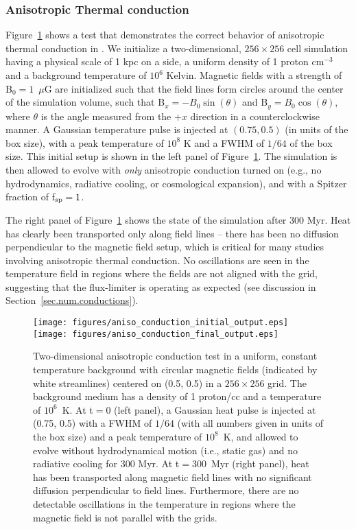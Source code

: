 \subsubsection{Anisotropic Thermal conduction}
\label{sec.tests.conduct}

Figure~\ref{fig.conduct} shows a test that demonstrates the correct
behavior of anisotropic thermal conduction in \enzo. We initialize a
two-dimensional, $256 \times 256$ cell simulation having a physical
scale of 1 kpc on a side, a uniform density of 1 proton cm$^{-3}$ and
a background temperature of $10^6$ Kelvin.  Magnetic fields with a
strength of B$_0 = 1$~$\mu$G are initialized such that the field lines
form circles around the center of the simulation volume, such that
B$_x = -B_0\sin(\theta)$ and B$_y = B_0\cos(\theta)$, where $\theta$
is the angle measured from the $+x$ direction in a counterclockwise
manner.  A Gaussian temperature pulse is injected at $(0.75, 0.5)$ (in
units of the box size), with a peak temperature of $10^8$ K and a FWHM
of $1/64$ of the box size.  This initial setup is shown in the left
panel of Figure~\ref{fig.conduct}.  The simulation is then allowed to
evolve with \textit{only} anisotropic conduction turned on (e.g., no
hydrodynamics, radiative cooling, or cosmological expansion), and with
a Spitzer fraction of f$_{\rm sp} = 1$.

The right panel of Figure~\ref{fig.conduct} shows the state of the
simulation after 300 Myr.  Heat has clearly been transported only
along field lines -- there has been no diffusion perpendicular to the
magnetic field setup, which is critical for many studies involving
anisotropic thermal conduction.  No oscillations are seen in the
temperature field in regions where the fields are not aligned with the
grid, suggesting that the flux-limiter is operating as expected (see
discussion in Section~\ref{sec.num.conductions}).

\begin{figure}
\begin{center}
\texttt{[image: figures/aniso\_conduction\_initial\_output.eps]}
\texttt{[image: figures/aniso\_conduction\_final\_output.eps]}
\caption{Two-dimensional anisotropic conduction test in a uniform, constant
temperature background with circular magnetic fields (indicated by white
streamlines) centered on (0.5, 0.5) in a $256 \times 256$ grid. The background
medium has a density of 1 proton/cc and a temperature of $10^6$~K.  At t$ = 0$
(left panel), a Gaussian heat pulse is injected at (0.75, 0.5) with a FWHM of
$1/64$ (with all numbers given in units of the box size) and a peak
temperature of $10^8$~K, and allowed to evolve without hydrodynamical motion
(i.e., static gas) and no radiative cooling for 300 Myr.  At t$ = 300$~Myr
(right panel), heat has been transported along magnetic field lines with no
significant diffusion perpendicular to field lines. Furthermore, there are no
detectable oscillations in the temperature in regions where the magnetic field
is not parallel with the grids.}
\label{fig.conduct}
\end{center}
\end{figure}
